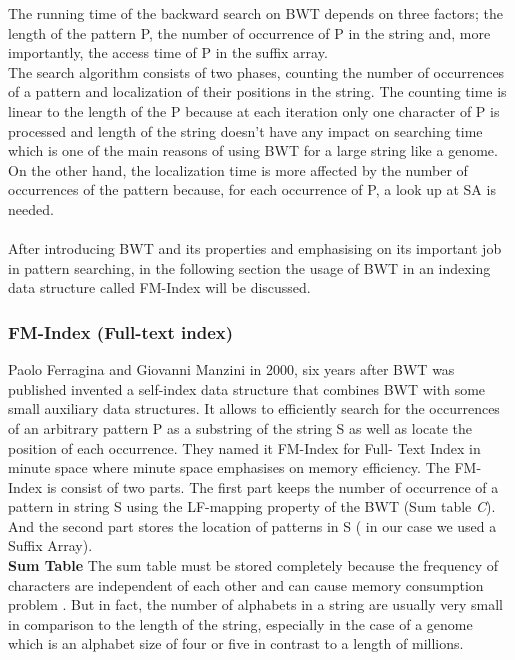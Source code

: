 \documentclass[11pt,a4paper]{report}
\begin{document}
The running time of the backward search on BWT depends on three factors; 
the length of the pattern P, the number of occurrence of P in the string and, 
more importantly, the access time of P in the suffix array.\\
The search algorithm consists of two phases, counting the number of occurrences of
a pattern and localization of their positions in the string.
The counting time is linear to the length of the P because at each iteration 
only one character of P is processed and length of the string doesn't have any 
impact on searching time which is one of the main reasons of using BWT for a large string like a genome.
On the other hand, the localization time is more affected by the number of occurrences 
of the pattern  because, for each occurrence of P, a look up at SA is needed.
\\\\

After introducing BWT and its properties and emphasising on its important job in pattern searching, in the following section the usage of BWT in an indexing data structure called FM-Index will be discussed\cite{fmindex}. 




\subsubsection{FM-Index (Full-text index)}

Paolo Ferragina and Giovanni Manzini in 2000, six years after BWT was 
published invented a self-index data structure that combines BWT with some 
small auxiliary data structures. It allows to efficiently search for the 
occurrences of an arbitrary pattern P as a substring of the string S as well 
as locate the position of each occurrence. They named it FM-Index for Full-
Text Index in minute space where minute space emphasises on memory efficiency.
The FM-Index is consist of two parts. The first part keeps the number of
occurrence of a pattern in string S using the LF-mapping property of the BWT (Sum table \emph{C}). 
And the second part stores the location of patterns in S ( in our case we used a Suffix Array)\cite{Wavthesis}.\\

\textbf{Sum Table}  The sum table must be stored completely because the frequency of characters
are independent of each other and can cause memory consumption problem \cite{Wavthesis}.
But in  fact, the number of alphabets in a string are usually very small in comparison to
the length of the string, especially in the case of a genome which is an alphabet size of 
four or five in contrast to a length of millions.
\\
\end{document}
